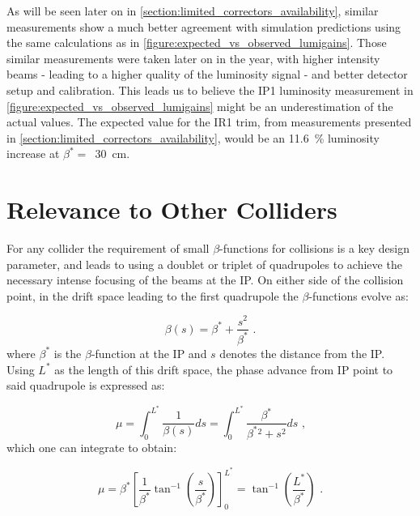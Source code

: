 \begin{warningblock}
    As will be seen later on in \cref{section:limited_correctors_availability}, similar measurements show a much better agreement with simulation predictions using the same calculations as in \cref{figure:expected_vs_observed_lumigains}. 
    Those similar measurements were taken later on in the year, with higher intensity beams - leading to a higher quality of the \gls{luminosity} signal - and better detector setup and calibration.
    This leads us to believe the IP\num{1} luminosity measurement in \cref{figure:expected_vs_observed_lumigains} might be an underestimation of the actual values.
    The expected value for the IR\num{1} trim, from measurements presented in \cref{section:limited_correctors_availability}, would be an \qty{11.6}{\percent} luminosity increase at \(\beta^{\ast} =\)~\qty{30}{\centi\meter}.
\end{warningblock}

\section{Relevance to Other Colliders}

For any collider the requirement of small \(\beta\)-functions for collisions is a key design parameter, and leads to using a doublet or triplet of quadrupoles to achieve the necessary intense focusing of the beams at the IP.
On either side of the collision point, in the drift space leading to the first quadrupole the \(\beta\)-functions evolve as:

\begin{equation}
    \beta(s) = \beta^{\ast} + \frac{s^2}{\beta^{\ast}} \text{ .}
    \label{equation:collider_drift_space_beta_function}
\end{equation}
where \(\beta^{\ast}\) is the \(\beta\)-function at the IP and \(s\) denotes the distance from the IP.
Using \(L^*\) as the length of this drift space, the phase advance from IP point to said quadrupole is expressed as:

\begin{equation}
    \mu = \int_0^{L^*} \frac{1}{\beta(s)} ds = \int_0^{L^*} \frac{\beta^{\ast}}{\beta^{\ast}{}^2 + s^2} ds \text{ ,}
    \label{equation:collider_drift_space_phase_advance_integral}
\end{equation}
which one can integrate to obtain:

\begin{equation}
    \mu = \beta^{\ast} \left[\frac{1}{\beta^{\ast}} \tan^{-1} \left(\frac{s}{\beta^{\ast}} \right) \right]_0^{L^*} = \tan^{-1} \left(\frac{L^*}{\beta^{\ast}} \right) \text{ .}
    \label{equation:collider_drift_space_phase_advance_integrated}
\end{equation}

